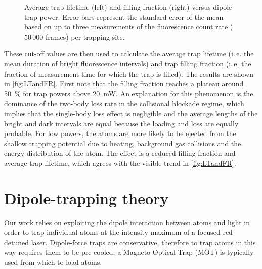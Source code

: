 \documentclass[../Thesis-IJspeert.tex]{subfiles}
\begin{document}
\begin{figure}[!t]
	\caption[An example of a floating figure]{Average trap lifetime (left) and filling fraction (right) versus dipole trap power. Error bars represent the standard error of the mean based on up to three measurements of the fluorescence count rate ($50\,000$ frames) per trapping site.} %
	\label{fig:LTandFR} 
\end{figure}
These cut-off values are then used to calculate the average trap lifetime (i.\,e. the mean duration of bright fluorescence intervals) and trap filling fraction (i.\,e. the fraction of measurement time for which the trap is filled). The results are shown in \autoref{fig:LTandFR}. First note that the filling fraction reaches a plateau around \SI{50}{\percent} for trap powers above \SI{20}{\milli\watt}. An explanation for this phenomenon is the dominance of the two-body loss rate in the collisional blockade regime, which implies that the single-body loss effect is negligible and the average lengths of the bright and dark intervals are equal because the loading and loss are equally probable. For low powers, the atoms are more likely to be ejected from the shallow trapping potential due to heating, background gas collisions and the energy distribution of the atom. The effect is a reduced filling fraction and average trap lifetime, which agrees with the visible trend in \autoref{fig:LTandFR}.

\iffalse
\section{Dipole-trapping theory}

Our work relies on exploiting the dipole interaction between atoms and light in order to trap individual atoms at the intensity maximum of a focused red-detuned laser. Dipole-force traps are conservative, therefore to trap atoms in this way requires them to be pre-cooled; a Magneto-Optical Trap (MOT) is typically used from which to load atoms. 
\end{document}
